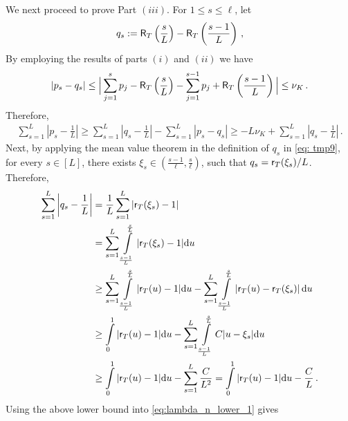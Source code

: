 \documentclass[11pt]{article}
\begin{document}
We next proceed to prove Part $(iii)$. 
For $1\leq s\leq \ell$, let 
\begin{equation}\label{eq: tmp9}
q_s:= \mathsf{R}_{T}\left( \frac{s}{L}\right)- \mathsf{R}_{T}\left( \frac{s-1}{L}\right)\,,
\end{equation}
By employing the results of parts $(i)$ and $(ii)$ we have
\begin{align*}
\left| p_s-q_s \right| \le \Big|\sum_{j=1}^{s} p_j - \mathsf{R}_{T}\left( \frac{s}{L}\right) - \sum_{j=1}^{s-1} p_j
+ \mathsf{R}_{T}\left( \frac{s-1}{L}\right) \Big| \leq \nu_K\,.
\end{align*}
Therefore,
\begin{align}
\sum\limits_{s=1}^{L}\left|p_s-\frac{1}{L}\right|
\geq \sum\limits_{s=1}^{L}\left|q_s-\frac{1}{L}\right| -\sum\limits_{s=1}^{L}\left|p_s-q_s\right|
\geq -L\nu_K+ \sum\limits_{s=1}^{L}\left|q_s-\frac{1}{L}\right|\label{eq:lambda_n_lower_1}\,.
\end{align}
Next, by applying the mean value theorem in the definition of $q_s$ in \eqref{eq: tmp9}, for every $s\in [L]$, there exists $\xi_s \in \left(\frac{s-1}{\ell},\frac{s}{\ell}  \right)$, such that $q_s=\mathsf{r}_{T}(\xi_s)/L$. Therefore,
\begin{align*}
	\sum\limits_{s=1}^{L} \left|q_s-\frac{1}{L}\right| &=\frac{1}{L}\sum\limits_{s=1}^{L} |\mathsf{r}_{T}(\xi_s)-1|\\
	&=\sum\limits_{s=1}^{L}\int\limits_{\frac{s-1}{L}}^{\frac{s}{L}}|\mathsf{r}_{T}(\xi_s)-1|{\rm d} u\\
	&\geq\sum\limits_{s=1}^{L}\int\limits_{\frac{s-1}{L}}^{\frac{s}{L}}|\mathsf{r}_{T}(u)-1|{\rm d} u-\sum\limits_{s=1}^{L}\int\limits_{\frac{s-1}{L}}^{\frac{s}{L}}\left|\mathsf{r}_{T}(u)-\mathsf{r}_{T}(\xi_s)\right|{\rm d} u\\
	&\geq \int\limits_{0}^{1}|\mathsf{r}_{T}(u)-1|{\rm d} u-  \sum\limits_{s=1}^{L} \int\limits_{\frac{s-1}{L}}^{\frac{s}{L}} {C|u-\xi_s|}{} {\rm d} u\\
	&\geq \int\limits_{0}^{1}|\mathsf{r}_{T}(u)-1|{\rm d} u-\sum\limits_{s=1}^{L}\frac{C}{L^2}=\int\limits_{0}^{1}|\mathsf{r}_{T}(u)-1|{\rm d} u-\frac{C}{L}\,.
\end{align*}	
Using the above lower bound into \eqref{eq:lambda_n_lower_1} gives  
\end{document}
